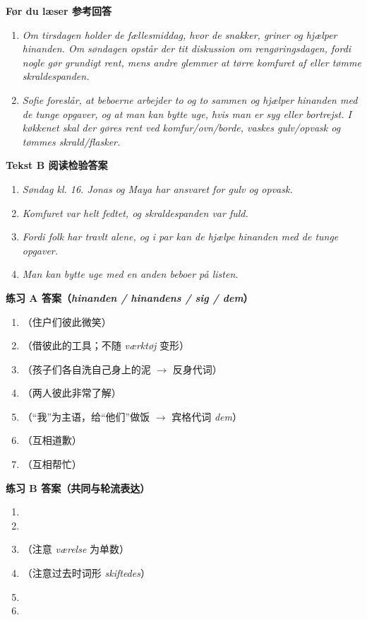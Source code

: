 \begin{answerbox}
\textbf{Før du læser 参考回答}
\begin{enumerate}
  \item \textit{Om tirsdagen holder de fællesmiddag, hvor de snakker, griner og hjælper hinanden. Om søndagen opstår der tit diskussion om rengøringsdagen, fordi nogle gør grundigt rent, mens andre glemmer at tørre komfuret af eller tømme skraldespanden.}
  \item \textit{Sofie foreslår, at beboerne arbejder to og to sammen og hjælper hinanden med de tunge opgaver, og at man kan bytte uge, hvis man er syg eller bortrejst. I køkkenet skal der gøres rent ved komfur/ovn/borde, vaskes gulv/opvask og tømmes skrald/flasker.}
\end{enumerate}

\textbf{Tekst B 阅读检验答案}
\begin{enumerate}
  \item \textit{Søndag kl. 16. Jonas og Maya har ansvaret for gulv og opvask.}
  \item \textit{Komfuret var helt fedtet, og skraldespanden var fuld.}
  \item \textit{Fordi folk har travlt alene, og i par kan de hjælpe hinanden med de tunge opgaver.}
  \item \textit{Man kan bytte uge med en anden beboer på listen.}
\end{enumerate}

\textbf{练习 A 答案（\textit{hinanden / hinandens / sig / dem}）}
\begin{enumerate}
  \item {}（住户们彼此微笑）
  \item {}（借彼此的工具；不随 \textit{værktøj} 变形）
  \item {}（孩子们各自洗自己身上的泥 $\rightarrow$ 反身代词）
  \item {}（两人彼此非常了解）
  \item {}（“我”为主语，给“他们”做饭 $\rightarrow$ 宾格代词 \textit{dem}）
  \item {}（互相道歉）
  \item {}（互相帮忙）
\end{enumerate}

\textbf{练习 B 答案（共同与轮流表达）}
\begin{enumerate}
  \item {}
  \item {}
  \item {}（注意 \textit{værelse} 为单数）
  \item {}（注意过去时词形 \textit{skiftedes}）
  \item {}
  \item {}
\end{enumerate}


\end{answerbox}

